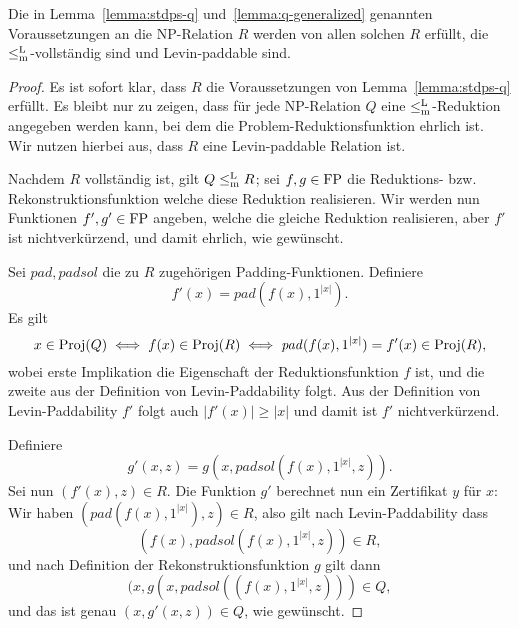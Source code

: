 \begin{lemma}
    Die in Lemma~\ref{lemma:stdps-q} und~\ref{lemma:q-generalized} genannten Voraussetzungen an die NP-Relation $R$ werden von allen solchen $R$ erfüllt, die $\leq_\mathrm{m}^\mathrm{L}$-vollständig sind und Levin-paddable sind.
\end{lemma}
\begin{proof}
    Es ist sofort klar, dass $R$ die Voraussetzungen von Lemma~\ref{lemma:stdps-q} erfüllt.
    Es bleibt nur zu zeigen, dass für jede NP-Relation $Q$ eine $\leq_\mathrm{m}^\mathrm{L}$-Reduktion angegeben werden kann, bei dem die Problem-Reduktionsfunktion ehrlich ist.
    Wir nutzen hierbei aus, dass $R$ eine Levin-paddable Relation ist.

    Nachdem $R$ vollständig ist, gilt $Q\leq_\mathrm{m}^\mathrm{L} R$; sei $f,g\in\mathrm{FP}$ die Reduktions- bzw. Rekonstruktionsfunktion welche diese Reduktion realisieren. Wir werden nun Funktionen $f', g'\in\mathrm{FP}$ angeben, welche die gleiche Reduktion realisieren, aber $f'$ ist nichtverkürzend, und damit ehrlich, wie gewünscht.

    Sei $\mathit{pad}, \mathit{padsol}$ die zu $R$ zugehörigen Padding-Funktionen. Definiere
    \[ f'(x) = \mathit{pad}(f(x), 1^{|x|}). \]
    Es gilt
    \[ x\in\operatorname{Proj}(Q) \iff f(x)\in \operatorname{Proj}(R) \iff \mathit{pad}(f(x), 1^{|x|})=f'(x)\in\operatorname{Proj}(R), \]
    wobei erste Implikation die Eigenschaft der Reduktionsfunktion $f$ ist, und die zweite aus der Definition von Levin-Paddability folgt.
    Aus der Definition von  Levin-Paddability $f'$ folgt auch $|f'(x)|\geq |x|$ und damit ist $f'$ nichtverkürzend.

    Definiere
    \[ g'(x, z) = g(x, \mathit{padsol}(f(x), 1^{|x|}, z)). \]
    Sei nun $(f'(x), z)\in R$. Die Funktion $g'$ berechnet nun ein Zertifikat $y$ für $x$: Wir haben $(\mathit{pad}(f(x), 1^{|x|}), z)\in R$, also gilt nach Levin-Paddability dass \[(f(x), \mathit{padsol}(f(x), 1^{|x|}, z))\in R,\] 
    und nach Definition der Rekonstruktionsfunktion $g$ gilt dann
    \[(x, g(x, \mathit{padsol}((f(x), 1^{|x|}, z)))\in Q,\]
    und das ist genau $(x, g'(x, z))\in Q$, wie gewünscht.
\end{proof}

